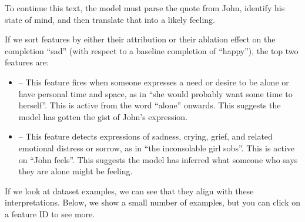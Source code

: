 \documentclass{article}
\newcommand{\featurechip}[2]{%
  \href{https://transformer-circuits.pub/2024/scaling-monosemanticity/features/index.html?featureId=#1_#2}{%
    \featurechipbox{\textcolor{white}{\textsf{\footnotesize #1/#2}}}%
  }%
}
\begin{document}
To continue this text, the model must parse the quote from John, identify his state of mind, and then translate that into a likely feeling.

If we sort features by either their attribution or their ablation effect on the completion “sad” (with respect to a baseline completion of “happy”), the top two features are:

\begin{itemize}
    \item \featurechip{1M}{22623} -- This feature fires when someone expresses a need or desire to be alone or have personal time and space, as in “she would probably want some time to herself”. This is active from the word “alone” onwards. This suggests the model has gotten the gist of John's expression.
    \item \featurechip{1M}{781220} -- This feature detects expressions of sadness, crying, grief, and related emotional distress or sorrow, as in “the inconsolable girl sobs”. This is active on “John feels”. This suggests the model has inferred what someone who says they are alone might be feeling.
\end{itemize}

If we look at dataset examples, we can see that they align with these interpretations. Below, we show a small number of examples, but you can click on a feature ID to see more.
\end{document}
